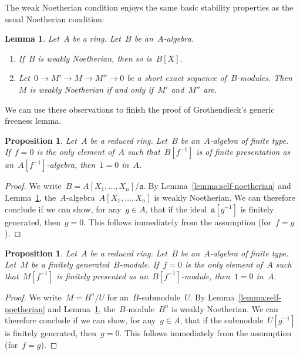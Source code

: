 \documentclass{amsart}
\theoremstyle{definition}
\theoremstyle{plain}
\newtheorem{prop}[defn]{Proposition}
\newtheorem{lemma}[defn]{Lemma}
\theoremstyle{remark}
\newcommand{\aaa}{\mathfrak{a}}
\begin{document}
The weak Noetherian condition enjoys the same basic stability properties as the
usual Noetherian condition:

\begin{lemma}\label{lemma:noetherian-stability}
Let~$A$ be a ring. Let~$B$ be an~$A$-algebra.
\begin{enumerate}
\item If~$B$ is weakly Noetherian, then so is~$B[X]$.
\item Let~$0 \to M' \to M \to M'' \to 0$ be a short exact sequence
of~$B$-modules. Then~$M$ is weakly Noetherian if and only if~$M'$ and~$M''$
are.
\end{enumerate}
\end{lemma}

We can use these observations to finish the proof of Grothendieck's generic
freeness lemma.

\begin{prop}Let~$A$ be a reduced ring. Let~$B$ be an~$A$-algebra of finite type.
If~$f = 0$ is the only element of~$A$ such that~$B[f^{-1}]$ is of finite
presentation as an~$A[f^{-1}]$-algebra, then~$1 = 0$ in~$A$.
\end{prop}

\begin{proof}We write~$B = A[X_1,\ldots,X_n]/\aaa$. By Lemma~\ref{lemma:self-noetherian} and
Lemma~\ref{lemma:noetherian-stability}, the~$A$-algebra~$A[X_1,\ldots,X_n]$ is
weakly Noetherian. We can therefore conclude if we can show, for any~$g \in A$,
that if the ideal~$\aaa[g^{-1}]$ is finitely generated, then~$g = 0$. This
follows immediately from the assumption (for~$f = g$).
\end{proof}

\begin{prop}Let~$A$ be a reduced ring. Let~$B$ be an~$A$-algebra of finite type.
Let~$M$ be a finitely generated~$B$-module. If~$f = 0$ is the only element
of~$A$ such that~$M[f^{-1}]$ is finitely presented as an~$B[f^{-1}]$-module,
then~$1 = 0$ in~$A$.
\end{prop}

\begin{proof}We write~$M = B^n/U$ for an~$B$-submodule~$U$. By Lemma~\ref{lemma:self-noetherian} and
Lemma~\ref{lemma:noetherian-stability}, the~$B$-module~$B^n$ is weakly
Noetherian. We can therefore conclude if we can show, for any~$g \in A$, that if
the submodule~$U[g^{-1}]$ is finitely generated, then~$g = 0$. This follows
immediately from the assumption (for~$f = g$).
\end{proof}
\end{document}
